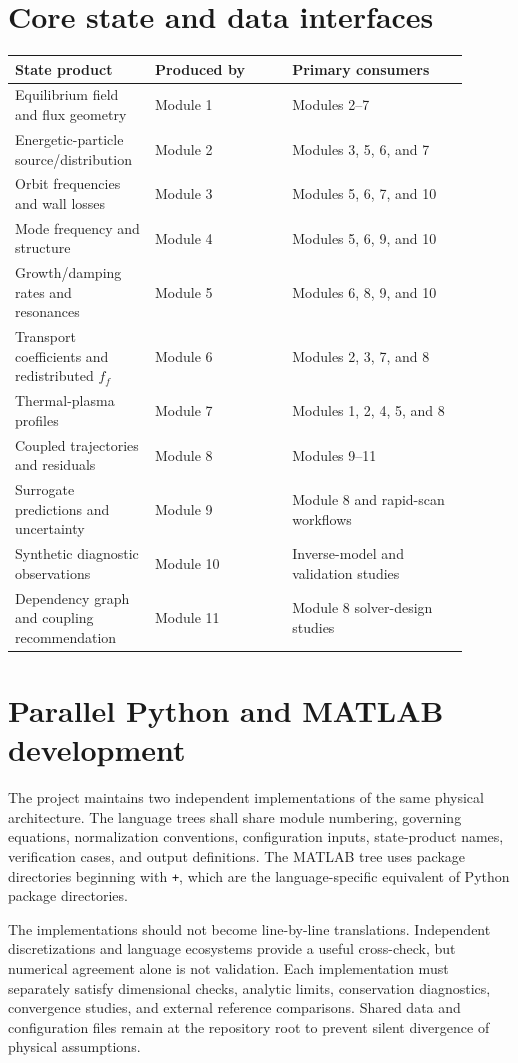 \documentclass[11pt]{article}
\begin{document}
\section{Core state and data interfaces}
\begin{longtable}{p{0.25\linewidth} p{0.29\linewidth} p{0.36\linewidth}}
\toprule
\textbf{State product} & \textbf{Produced by} & \textbf{Primary consumers}\\
\midrule
Equilibrium field and flux geometry & Module 1 & Modules 2--7\\
Energetic-particle source/distribution & Module 2 & Modules 3, 5, 6, and 7\\
Orbit frequencies and wall losses & Module 3 & Modules 5, 6, 7, and 10\\
Mode frequency and structure & Module 4 & Modules 5, 6, 9, and 10\\
Growth/damping rates and resonances & Module 5 & Modules 6, 8, 9, and 10\\
Transport coefficients and redistributed $f_f$ & Module 6 & Modules 2, 3, 7, and 8\\
Thermal-plasma profiles & Module 7 & Modules 1, 2, 4, 5, and 8\\
Coupled trajectories and residuals & Module 8 & Modules 9--11\\
Surrogate predictions and uncertainty & Module 9 & Module 8 and rapid-scan workflows\\
Synthetic diagnostic observations & Module 10 & Inverse-model and validation studies\\
Dependency graph and coupling recommendation & Module 11 & Module 8 solver-design studies\\
\bottomrule
\end{longtable}

\section{Parallel Python and MATLAB development}
The project maintains two independent implementations of the same physical architecture. The language trees shall share module numbering, governing equations, normalization conventions, configuration inputs, state-product names, verification cases, and output definitions. The MATLAB tree uses package directories beginning with \texttt{+}, which are the language-specific equivalent of Python package directories.

The implementations should not become line-by-line translations. Independent discretizations and language ecosystems provide a useful cross-check, but numerical agreement alone is not validation. Each implementation must separately satisfy dimensional checks, analytic limits, conservation diagnostics, convergence studies, and external reference comparisons. Shared data and configuration files remain at the repository root to prevent silent divergence of physical assumptions.
\end{document}
